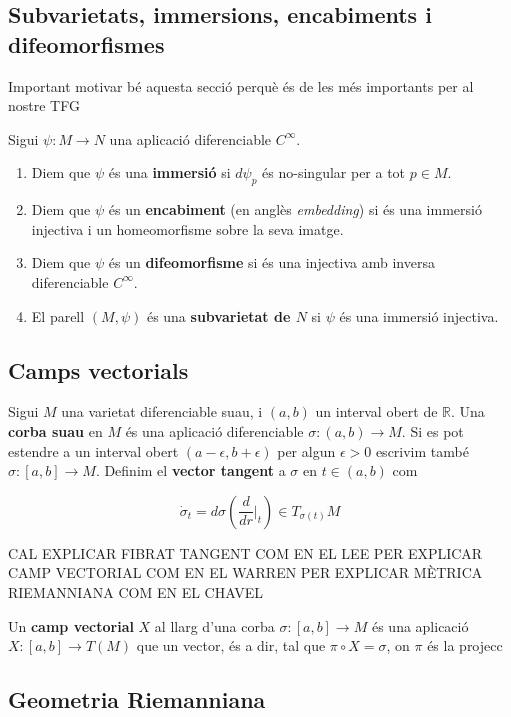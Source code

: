 \subsection{Subvarietats, immersions, encabiments i difeomorfismes}
{\color{blue} Important motivar bé aquesta secció perquè és de les més importants per al nostre TFG}
\begin{defi}
    Sigui $\psi:M\to N$ una aplicació diferenciable {\color{blue} $C^\infty$}.
    \begin{enumerate}
        \item Diem que $\psi$ és una \textbf{immersió} si $d\psi_p$ és no-singular per a tot $p\in M$.
        \item Diem que $\psi$ és un \textbf{encabiment} (en anglès \textit{embedding}) si és una immersió injectiva i un homeomorfisme sobre la seva imatge.
        \item Diem que $\psi$ és un \textbf{difeomorfisme} si és una injectiva amb inversa diferenciable {\color{blue} $C^\infty$}.
        \item El parell $(M, \psi)$ és una \textbf{subvarietat de $N$} si $\psi$ és una immersió injectiva.
    \end{enumerate}
\end{defi}

\subsection{Camps vectorials}
\begin{defi}
    Sigui $M$ una varietat diferenciable suau, i $(a,b)$ un interval obert de $\mathbb R$. Una \textbf{corba suau} en $M$ és una aplicació diferenciable $\sigma:(a,b)\to M$. Si es pot estendre a un interval obert $(a-\epsilon,b+\epsilon)$ per algun $\epsilon>0$ escrivim també $\sigma:[a,b]\to M$. Definim el \textbf{vector tangent} a $\sigma$ en $t\in(a,b)$ com

    \begin{equation*}
        \dot{\sigma}_t = d\sigma\left(\frac{d}{dr}\Big|_{t}\right)\in T_{\sigma(t)}M
    \end{equation*}
\end{defi}

{\color{red} CAL EXPLICAR FIBRAT TANGENT COM EN EL LEE PER EXPLICAR CAMP VECTORIAL COM EN EL WARREN PER EXPLICAR MÈTRICA RIEMANNIANA COM EN EL CHAVEL}

\begin{defi}
    Un \textbf{camp vectorial} $X$ al llarg d'una corba $\sigma:[a,b]\to M$ és una aplicació $X:[a,b]\to T(M)$ que  un vector, és a dir, tal que $\pi\circ X = \sigma$, on $\pi$ és la projecc
\end{defi}



\subsection{Geometria Riemanniana}



\newpage